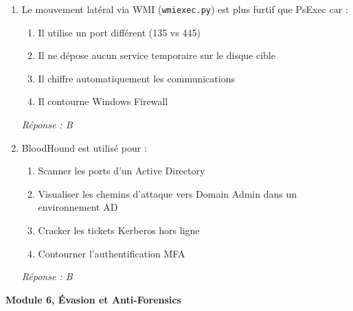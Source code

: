 \begin{enumerate}[resume]
\item Le mouvement latéral via WMI (\texttt{wmiexec.py}) est plus furtif que PsExec car :
\begin{enumerate}[label=\Alph*.]
    \item Il utilise un port différent (135 vs 445)
    \item Il ne dépose aucun service temporaire sur le disque cible
    \item Il chiffre automatiquement les communications
    \item Il contourne Windows Firewall
\end{enumerate}
\textit{Réponse : B}

\item BloodHound est utilisé pour :
\begin{enumerate}[label=\Alph*.]
    \item Scanner les ports d'un Active Directory
    \item Visualiser les chemins d'attaque vers Domain Admin dans un environnement AD
    \item Cracker les tickets Kerberos hors ligne
    \item Contourner l'authentification MFA
\end{enumerate}
\textit{Réponse : B}

\end{enumerate}

\medskip
\noindent\textbf{Module 6, Évasion et Anti-Forensics}

